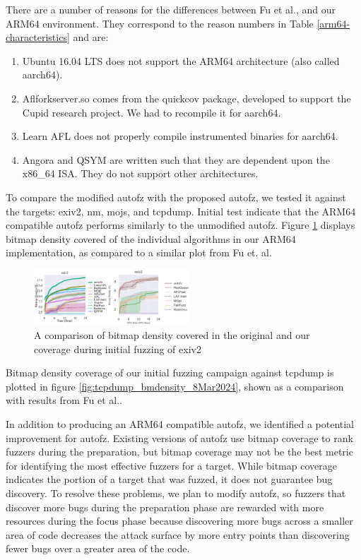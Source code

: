There are a number of reasons for the differences between Fu et al.,
and our ARM64 environment. They correspond to the reason numbers in Table 
\ref{arm64-characteristics} and are:

\begin{enumerate}
    \item Ubuntu 16.04 LTS does not support the ARM64 architecture (also called 
    aarch64).
    \item Aflforkserver.so comes from the quickcov package, developed to support 
    the Cupid research project\cite{guler_cupid_2020}. We had to recompile it for aarch64.
    \item Learn AFL does not properly compile instrumented binaries for aarch64.
    \item Angora and QSYM are written such that they are dependent upon the x86\_64 ISA.
    They do not support other architectures.
\end{enumerate}

To compare the  modified autofz with the proposed autofz, we tested it against the 
targets: exiv2, nm, mojs, and tcpdump. Initial test indicate that the ARM64 compatible 
autofz performs similarly to the unmodified autofz. Figure \ref{fig:exiv2_compare_orig_arm64} 
displays bitmap density covered of the individual algorithms in our ARM64 implementation, 
as compared to a similar plot from Fu et. al\cite{fu_autofz_2023}.

\begin{figure}
    \includegraphics[width=0.52\textwidth]{figs/exiv2_compare_orig_arm64.png}
    \centering
    \caption{A comparison of bitmap density covered in the original\cite{fu_autofz_2023} and our 
    coverage during initial fuzzing of exiv2}
    \label{fig:exiv2_compare_orig_arm64}
\end{figure}

Bitmap density coverage of our initial fuzzing campaign against tcpdump is plotted 
in figure \ref{fig:tcpdump_bmdensity_8Mar2024}, shown as a comparison with results 
from Fu et al.\cite{fu_autofz_2023}.

In addition to producing an ARM64 compatible autofz, we identified a potential improvement for autofz.
Existing versions of autofz use bitmap coverage to rank fuzzers during the preparation, but bitmap
coverage may not be the best metric for identifying the most effective fuzzers for a target. While
bitmap coverage indicates the portion of a target that was fuzzed, it does not guarantee bug discovery.
To resolve these problems, we plan to modify autofz, so fuzzers that discover more bugs during the
preparation phase are rewarded with more resources during the focus phase because discovering more bugs
across a smaller area of code decreases the attack surface by more entry points than discovering fewer
bugs over a greater area of the code.